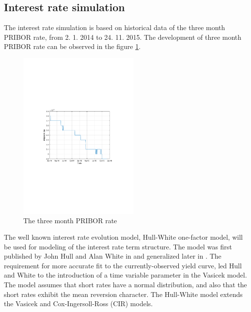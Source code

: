 \documentclass{amsart}
\theoremstyle{definition}\newtheorem{definition}[theorem]{Definition}
\theoremstyle{remark}\newtheorem{remark}[theorem]{Remark}
\begin{document}
\subsection{Interest rate simulation}
The interest rate simulation is based on historical data of the three month PRIBOR rate, from 2. 1. 2014 to 24. 11. 2015.  
The development of three month PRIBOR rate can be observed in the figure \ref{PRIBOR}.

\begin{figure}[!htbp]
  \centering 
	\includegraphics[width=6cm, clip, trim= 110 270 110 270]{IMG/PRIBOR.pdf}
  \caption{The three month PRIBOR rate}  \label{PRIBOR}
\end{figure}

The well known interest rate evolution model, Hull-White one-factor model, will be used for modeling of the interest rate term structure. 
The model was first published by John Hull and Alan White in \cite{hull1990pricing} and generalized later in \cite{hull2001general}.
The requirement for more accurate fit to the currently-observed yield curve, led Hull and White to the introduction of a time variable parameter in the Vasicek model. 
The model assumes that short rates have a normal distribution, and also that the short rates exhibit the mean reversion character. 
The Hull-White model extends the Vasicek and Cox-Ingersoll-Ross (CIR) models.
\end{document}
